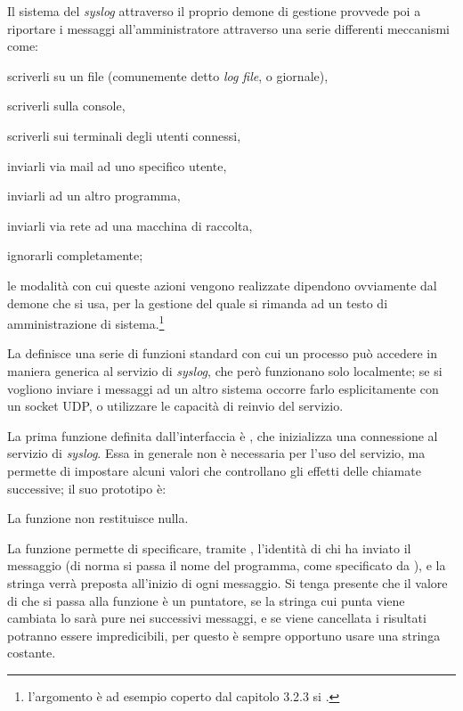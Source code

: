Il sistema del \textit{syslog} attraverso il proprio demone di gestione
provvede poi a riportare i messaggi all'amministratore attraverso una serie
differenti meccanismi come:
\begin{itemize*}
\item scriverli su un file (comunemente detto \textit{log file}, o giornale),
\item scriverli sulla console,
\item scriverli sui terminali degli utenti connessi,
\item inviarli via mail ad uno specifico utente,
\item inviarli ad un altro programma,
\item inviarli via rete ad una macchina di raccolta,
\item ignorarli completamente;
\end{itemize*}
le modalità con cui queste azioni vengono realizzate dipendono ovviamente dal
demone che si usa, per la gestione del quale si rimanda ad un testo di
amministrazione di sistema.\footnote{l'argomento è ad esempio coperto dal
  capitolo 3.2.3 si \cite{AGL}.}

La  definisce una serie di funzioni standard con cui un processo
può accedere in maniera generica al servizio di \textit{syslog}, che però
funzionano solo localmente; se si vogliono inviare i messaggi ad un altro
sistema occorre farlo esplicitamente con un socket UDP, o utilizzare le
capacità di reinvio del servizio.

La prima funzione definita dall'interfaccia è , che inizializza
una connessione al servizio di \textit{syslog}. Essa in generale non è
necessaria per l'uso del servizio, ma permette di impostare alcuni valori che
controllano gli effetti delle chiamate successive; il suo prototipo è:

\begin{funcproto}{
}

{La funzione non restituisce nulla.}
\end{funcproto}

La funzione permette di specificare, tramite , l'identità di chi
ha inviato il messaggio (di norma si passa il nome del programma, come
specificato da ), e la stringa verrà preposta all'inizio di ogni
messaggio. Si tenga presente che il valore di  che si passa alla
funzione è un puntatore, se la stringa cui punta viene cambiata lo sarà pure
nei successivi messaggi, e se viene cancellata i risultati potranno essere
impredicibili, per questo è sempre opportuno usare una stringa costante.

